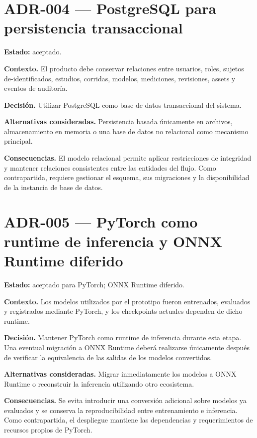 \section*{ADR-004 --- PostgreSQL para persistencia transaccional}
\label{adr:004-postgresql-persistencia}

\textbf{Estado:} aceptado.

\textbf{Contexto.} El producto debe conservar relaciones entre usuarios, roles, sujetos de-identificados, estudios, corridas, modelos, mediciones, revisiones, assets y eventos de auditoría.

\textbf{Decisión.} Utilizar PostgreSQL como base de datos transaccional del sistema.

\textbf{Alternativas consideradas.} Persistencia basada únicamente en archivos, almacenamiento en memoria o una base de datos no relacional como mecanismo principal.

\textbf{Consecuencias.} El modelo relacional permite aplicar restricciones de integridad y mantener relaciones consistentes entre las entidades del flujo. Como contrapartida, requiere gestionar el esquema, sus migraciones y la disponibilidad de la instancia de base de datos.

\section*{ADR-005 --- PyTorch como runtime de inferencia y ONNX Runtime diferido}
\label{adr:005-pytorch-onnx-runtime}

\textbf{Estado:} aceptado para PyTorch; ONNX Runtime diferido.

\textbf{Contexto.} Los modelos utilizados por el prototipo fueron entrenados, evaluados y registrados mediante PyTorch, y los checkpoints actuales dependen de dicho runtime.

\textbf{Decisión.} Mantener PyTorch como runtime de inferencia durante esta etapa. Una eventual migración a ONNX Runtime deberá realizarse únicamente después de verificar la equivalencia de las salidas de los modelos convertidos.

\textbf{Alternativas consideradas.} Migrar inmediatamente los modelos a ONNX Runtime o reconstruir la inferencia utilizando otro ecosistema.

\textbf{Consecuencias.} Se evita introducir una conversión adicional sobre modelos ya evaluados y se conserva la reproducibilidad entre entrenamiento e inferencia. Como contrapartida, el despliegue mantiene las dependencias y requerimientos de recursos propios de PyTorch.

